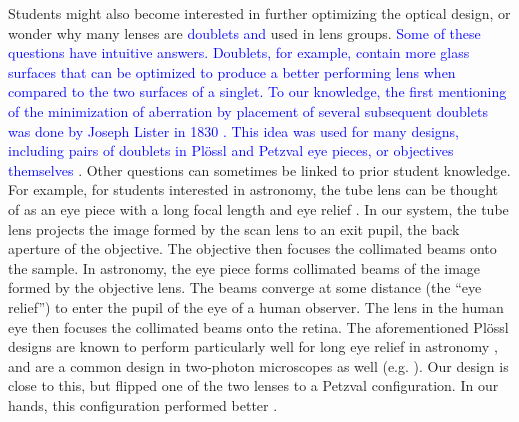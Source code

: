 \documentclass[10pt,letterpaper]{article}
\begin{document}
Students might also become interested in further optimizing the optical design, or wonder why many lenses are \textcolor{blue}{doublets and} used in lens groups. \textcolor{blue}{Some of these questions have intuitive answers. Doublets, for example, contain more glass surfaces that can be optimized to produce a better performing lens when compared to the two surfaces of a singlet\cite{ThorlabsLens}. To our knowledge, the first mentioning of the minimization of aberration by placement of several subsequent doublets was done by Joseph Lister in 1830 \cite{Lister1830}. This idea was used for many designs, including pairs of doublets in Pl\"ossl and Petzval eye pieces, or objectives themselves \cite{Zhang2019}}. Other questions can sometimes be linked to prior student knowledge. For example, for students interested in astronomy, the tube lens can be thought of as an eye piece with a long focal length and eye relief \cite{Smith2007}. In our system, the tube lens projects the image formed by the scan lens to an exit pupil, the back aperture of the objective. The objective then focuses the collimated beams onto the sample. In astronomy, the eye piece forms collimated beams of the image formed by the objective lens. The beams converge at some distance (the ``eye relief'') to enter the pupil of the eye of a human observer. The lens in the human eye then focuses the collimated beams onto the retina. The aforementioned Pl\"ossl designs are known to perform particularly well for long eye relief in astronomy \cite{Smith2007, Nagler1983}, and are a common design in two-photon microscopes as well (e.g. \cite{Rupprecht2024}). Our design is close to this, but flipped one of the two lenses to a Petzval configuration. In our hands, this configuration performed better \cite{Hong2022, Bumstead2018, Mayrhofer2015}.\newline
\end{document}
